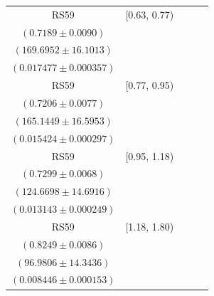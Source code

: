 {\begin{longtable}{|c|c|c|c|c|}
RS59 & [0.63, 0.77) & \begin{tabular}{@{}c@{}}$0.7432 \pm 0.0054$ \\ $(0.7189 \pm 0.0090)$\end{tabular} & \begin{tabular}{@{}c@{}}$164.1543 \pm 15.5756$ \\ $(169.6952 \pm 16.1013)$\end{tabular} & \begin{tabular}{@{}c@{}}$0.015873 \pm 0.000454$ \\ $(0.017477 \pm 0.000357)$\end{tabular} \\ \hline
RS59 & [0.77, 0.95) & \begin{tabular}{@{}c@{}}$0.7170 \pm 0.0062$ \\ $(0.7206 \pm 0.0077)$\end{tabular} & \begin{tabular}{@{}c@{}}$165.9681 \pm 16.6781$ \\ $(165.1449 \pm 16.5953)$\end{tabular} & \begin{tabular}{@{}c@{}}$0.014461 \pm 0.000381$ \\ $(0.015424 \pm 0.000297)$\end{tabular} \\ \hline
RS59 & [0.95, 1.18) & \begin{tabular}{@{}c@{}}$0.7298 \pm 0.0064$ \\ $(0.7299 \pm 0.0068)$\end{tabular} & \begin{tabular}{@{}c@{}}$124.6922 \pm 14.6942$ \\ $(124.6698 \pm 14.6916)$\end{tabular} & \begin{tabular}{@{}c@{}}$0.012216 \pm 0.000323$ \\ $(0.013143 \pm 0.000249)$\end{tabular} \\ \hline
RS59 & [1.18, 1.80) & \begin{tabular}{@{}c@{}}$0.7149 \pm 0.0084$ \\ $(0.8249 \pm 0.0086)$\end{tabular} & \begin{tabular}{@{}c@{}}$111.9065 \pm 16.5512$ \\ $(96.9806 \pm 14.3436)$\end{tabular} & \begin{tabular}{@{}c@{}}$0.008176 \pm 0.000199$ \\ $(0.008446 \pm 0.000153)$\end{tabular} \\ \hline
\end{longtable}
}
